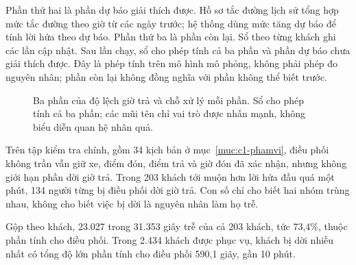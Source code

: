 Phần thứ hai là phần dự báo giải thích được. Hồ sơ tắc đường lịch sử tổng hợp mức tắc đường theo giờ từ
các ngày trước; hệ thống dùng mức tăng dự báo để tính lời hứa theo dự báo. Phần thứ ba là phần còn lại.
Sổ theo từng khách ghi các lần cập nhật. Sau lần chạy, sổ cho phép tính cả ba phần và phần dự báo chưa giải
thích được. Đây là phép tính trên mô hình mô phỏng, không phải phép đo nguyên nhân; phần còn lại
không đồng nghĩa với phần không thể biết trước.

\begin{figure}[htbp]
\centering
{}
\caption[Ba phần của độ lệch giờ trả và chỗ xử lý]{Ba phần của độ lệch giờ trả và chỗ xử lý mỗi phần. Sổ cho phép tính cả ba phần; các mũi tên chỉ vai trò
được nhấn mạnh, không biểu diễn quan hệ nhân quả.}
\label{hinh:c1-baphan}
\end{figure}

Trên tập kiểm tra chính, gồm 34 kịch bản ở mục~\ref{muc:c1-phamvi}, điều phối không trần vẫn giữ xe, điểm đón,
điểm trả và giờ đón đã xác nhận, nhưng không giới hạn phần dời giờ trả. Trong 203 khách tới muộn hơn lời hứa
đầu quá một phút, 134 người từng bị điều phối dời giờ trả. Con số chỉ cho biết hai nhóm trùng nhau, không
cho biết việc bị dời là nguyên nhân làm họ trễ.

Gộp theo khách, 23.027 trong 31.353 giây trễ của cả 203 khách, tức 73,4\%, thuộc phần tính cho điều phối.
Trong 2.434 khách được phục vụ, khách bị dời nhiều nhất có tổng độ lớn phần tính cho điều phối 590,1 giây,
gần 10 phút.

